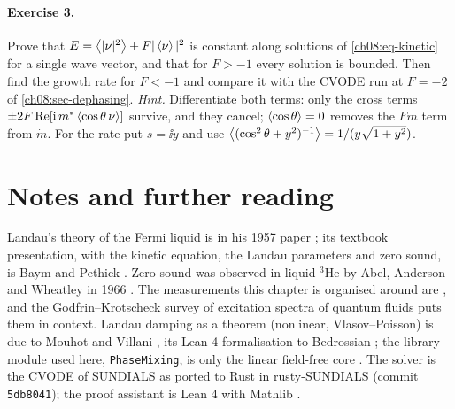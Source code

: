 \paragraph{Exercise 3.}
Prove that $E=\left\langle |\nu|^2\right\rangle+F|\left\langle \nu\right\rangle|^2$ is constant along solutions of \eqref{ch08:eq-kinetic} for a single wave vector, and that for $F>-1$ every solution is bounded.
Then find the growth rate for $F<-1$ and compare it with the CVODE run at $F=-2$ of \cref{ch08:sec-dephasing}.
\emph{Hint.} Differentiate both terms: only the cross terms $\pm2F\operatorname{Re}[\mathrm{i}\,m^*\left\langle \cos\theta\,\nu\right\rangle]$ survive, and they cancel; $\left\langle \cos\theta\right\rangle=0$ removes the $Fm$ term from $\dot m$. For the rate put $s=\ii y$ and use $\left\langle (\cos^2\theta+y^2)^{-1}\right\rangle=1/(y\sqrt{1+y^2})$.

\section*{Notes and further reading}

Landau's theory of the Fermi liquid is in his 1957 paper \cite{Landau1957}; its textbook presentation, with the kinetic equation, the Landau parameters and zero sound, is Baym and Pethick \cite{BaymPethick1991}.
Zero sound was observed in liquid $^3$He by Abel, Anderson and Wheatley in 1966 \cite{AbelAndersonWheatley1966}.
The measurements this chapter is organised around are \cite{Godfrin2010,Godfrin2012}, and the Godfrin--Krotscheck survey of excitation spectra of quantum fluids \cite{GodfrinKrotscheck2022} puts them in context.
Landau damping as a theorem (nonlinear, Vlasov--Poisson) is due to Mouhot and Villani \cite{MouhotVillani2011}, its Lean 4 formalisation to Bedrossian \cite{Bedrossian2026}; the library module used here, \texttt{PhaseMixing}, is only the linear field-free core \cite{Callens2026lib}.
The solver is the CVODE of SUNDIALS \cite{Hindmarsh2005} as ported to Rust in rusty-SUNDIALS (commit \texttt{5db8041}); the proof assistant is Lean 4 with Mathlib \cite{deMoura2021,Mathlib2020}.
\renewcommand{\topfraction}{0.7}\renewcommand{\textfraction}{0.2}\renewcommand{\floatpagefraction}{0.5}\setcounter{topnumber}{2}
